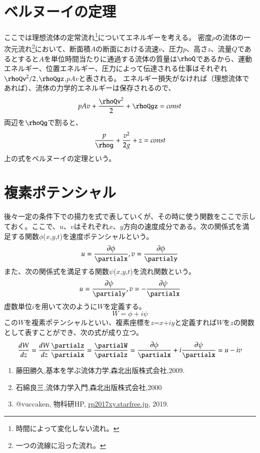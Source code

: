 \documentclass[10pt,b5paper,papersize,dvipdfmx]{jsbook}
\begin{document}
\section{ベルヌーイの定理}
ここでは理想流体の定常流れ\footnote{時間によって変化しない流れ。}についてエネルギーを考える。
密度$\rho$の流体の一次元流れ\footnote{一つの流線に沿った流れ。}において、断面積$A$の断面における流速$v$、圧力$p$、高さ$z$、流量$Q$であるとすると$A$を単位時間当たりに通過する流体の質量は$\rhoQ$であるから、運動エネルギー、位置エネルギー、圧力によって伝達される仕事はそれぞれ$\rhoQv^2/2$,$\rhoQgz$,$pAv$と表される。
エネルギー損失がなければ（理想流体であれば）、流体の力学的エネルギーは保存されるので、
\begin{equation}
pAv+\frac{\rhoQv^2}{2}+\rhoQgz=const
\end{equation}
両辺を$\rhoQg$で割ると、
\begin{equation}
\frac{p}{\rhog}+\frac{v^2}{2g}+z=const
\end{equation}
上の式をベルヌーイの定理という。
\par
\section{複素ポテンシャル}
後々一定の条件下での揚力を式で表していくが、その時に使う関数をここで示しておく。ここで、$u$、$v$はそれぞれ$x$、$y$方向の速度成分である。次の関係式を満足する関数$\phi$($x$,$y$,$t$)を速度ポテンシャルという。
\begin{equation}
u=\frac{\partial\phi}{\partialx}, v=\frac{\partial\phi}{\partialy}
\end{equation}
また、次の関係式を満足する関数$\psi$($x$,$y$,$t$)を流れ関数という。
\begin{equation}
u=\frac{\partial\psi}{\partialy}, v=-\frac{\partial\psi}{\partialx}
\end{equation}
虚数単位$i$を用いて次のように$W$を定義する。
\begin{equation}
W=\phi+i\psi
\end{equation}
この$W$を複素ポテンシャルといい、複素座標を$z$=$x$+$i$$y$と定義すれば$W$を$z$の関数として表すことができ、次の式が成り立つ。
\begin{equation}
\frac{dW}{dz}=\frac{dW}{dz}\frac{\partialz}{\partialx}=\frac{\partialW}{\partialz}=\frac{\partial\phi}{\partialx}+i\frac{\partial\psi}{\partialx}=u-iv
\end{equation}






\begin{sanko}
  \begin{enumerate}
    \item 藤田勝久,基本を学ぶ流体力学,森北出版株式会社,2009.
    \item 石綿良三,流体力学入門,森北出版株式会社,2000
    \item @vuccaken, 物科研HP, \url{rp2017xy.starfree.jp}, 2019.
  \end{enumerate}
\end{sanko}
\end{document}
